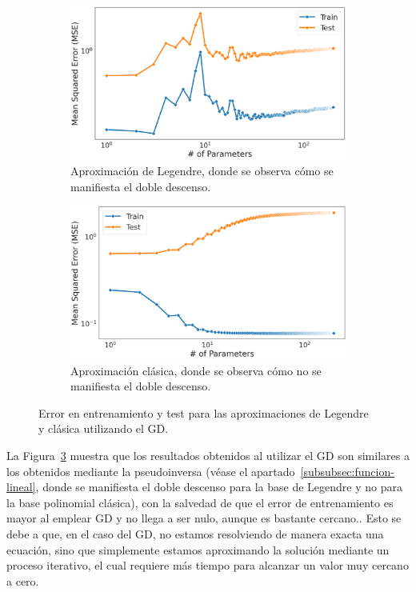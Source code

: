 \begin{figure}[h]
    \centering
    \begin{subfigure}[b]{0.48\textwidth}
        \centering
        \includegraphics[width=\textwidth]{img/experiments/LegendreFeaturesGD_DDD.png}
        \caption{Aproximación de Legendre, donde se observa cómo se manifiesta el doble descenso.}\label{fig:LegendreFeaturesGD_DDD}
    \end{subfigure}
    \hfill
    \begin{subfigure}[b]{0.48\textwidth}
        \centering
        \includegraphics[width=\textwidth]{img/experiments/PolyFeaturesGD_DDD.png}
        \caption{Aproximación clásica, donde se observa cómo no se manifiesta el doble descenso.}\label{fig:PolyFeaturesGD_DDD}
    \end{subfigure}
    \caption[Error en entrenamiento y test para las aproximaciones de Legendre y clásica utilizando el GD.]{Error en entrenamiento y test para las aproximaciones de Legendre y clásica utilizando el GD.}\label{fig:aproximaciones-gd}
\end{figure}

La Figura~\ref{fig:aproximaciones-gd} muestra que los resultados obtenidos al utilizar el GD son similares a los obtenidos mediante la pseudoinversa (véase el apartado~\ref{subsubsec:funcion-lineal}, donde se manifiesta el doble descenso para la base de Legendre y no para la base polinomial clásica), con la salvedad de que el error de entrenamiento es mayor al emplear GD y no llega a ser nulo, aunque es bastante cercano.. Esto se debe a que, en el caso del GD, no estamos resolviendo de manera exacta una ecuación, sino que simplemente estamos aproximando la solución mediante un proceso iterativo, el cual requiere más tiempo para alcanzar un valor muy cercano a cero.


